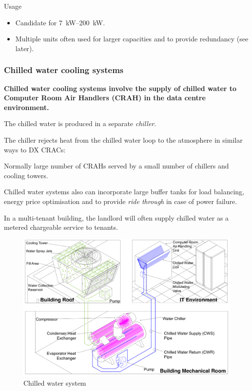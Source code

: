 \documentclass[slides]{pgnotes}
\begin{document}
\begin{greenbox}{Usage}
  \begin{itemize}
  \item Candidate for \SIrange{7}{200}{\kilo\watt}.
  \item Multiple units often used for larger capacities and to provide redundancy (see later).
  \end{itemize}
\end{greenbox}



\subsubsection{Chilled water cooling systems}

\textbf{Chilled water cooling systems involve the supply of chilled water to Computer Room Air Handlers (CRAH) in the data centre environment.}

The chilled water is produced in a separate \textit{chiller}.

The chiller rejects heat from the chilled water loop to the atmosphere in similar ways to DX CRACs:

Normally large number of CRAHs served by a small number of chillers and cooling towers.

Chilled water systems also can incorporate large buffer tanks for load balancing, energy price optimisation and to provide \textit{ride through} in case of power failure.


In a multi-tenant building, the landlord will often supply chilled water as a metered chargeable service to tenants.

\begin{figure}[htbp]
  \centering
  \includegraphics[width=0.7\linewidth]{chilled_water_system_water_cooled}
  \caption{Chilled water system}
  \label{fig:chilled-water-system-water-cooled}
\end{figure}
\end{document}
